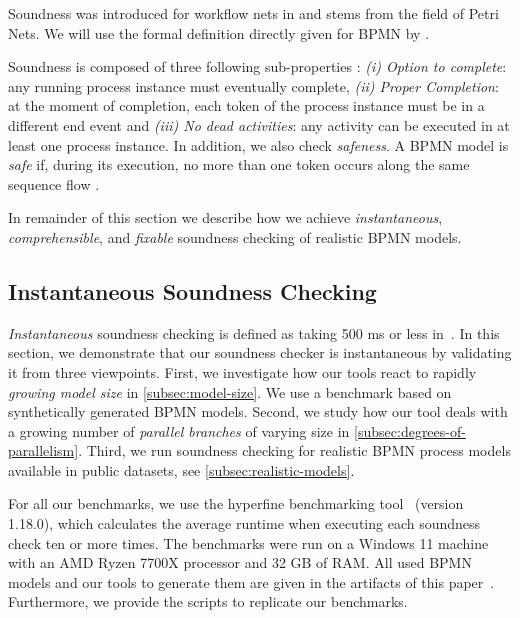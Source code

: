 \documentclass[runningheads]{llncs}
\begin{document}
Soundness was introduced for workflow nets in \cite{vanderaalstAPPLICATIONPETRINETS1998} and stems from the field of Petri Nets.
We will use the formal definition directly given for BPMN by \cite{corradiniClassificationBPMNCollaborations2018}.

Soundness is composed of three following sub-properties \cite{corradiniClassificationBPMNCollaborations2018}:
\textit{(i) Option to complete}: any running process instance must eventually complete,
\textit{(ii) Proper Completion}: at the moment of completion, each token of the process instance must be in a different end event and
\textit{(iii) No dead activities}: any activity can be executed in at least one process instance.
In addition, we also check \textit{safeness}.
A BPMN model is \textit{safe} if, during its execution, no more than one token occurs along the same sequence flow \cite{corradiniClassificationBPMNCollaborations2018}.

In remainder of this section we describe how we achieve \textit{instantaneous}, \textit{comprehensible}, and \textit{fixable} soundness checking of realistic BPMN models.


\subsection{Instantaneous Soundness Checking} \label{subsec:instantaneous}
\textit{Instantaneous} soundness checking is defined as taking 500 ms or less in~\cite{fahlandAnalysisDemandInstantaneous2011}.
In this section, we demonstrate that our soundness checker is instantaneous by validating it from three viewpoints.
First, we investigate how our tools react to rapidly \textit{growing model size} in \autoref{subsec:model-size}.
We use a benchmark based on synthetically generated BPMN models.
Second, we study how our tool deals with a growing number of \textit{parallel branches} of varying size in \autoref{subsec:degrees-of-parallelism}.
Third, we run soundness checking for realistic BPMN process models available in public datasets, see \autoref{subsec:realistic-models}.

For all our benchmarks, we use the hyperfine benchmarking tool~\cite{peterHyperfine2023} (version 1.18.0), which calculates the average runtime when executing each soundness check ten or more times.
The benchmarks were run on a Windows 11 machine with an AMD Ryzen 7700X processor and 32 GB of RAM.
All used BPMN models and our tools to generate them are given in the artifacts of this paper~\cite{noauthorgivenBPM2024Artifacts2024}.
Furthermore, we provide the scripts to replicate our benchmarks.
\end{document}
